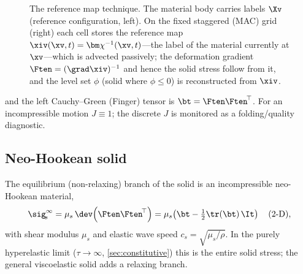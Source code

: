 \begin{figure}[t]\centering
{}
\caption{The reference map technique. The material body carries labels $\Xv$ (reference
configuration, left). On the fixed staggered (MAC) grid (right) each cell stores the
reference map $\xiv(\xv,t)=\bm\chi^{-1}(\xv,t)$---the label of the material currently at
$\xv$---which is advected passively; the deformation gradient $\Ften=(\grad\xiv)^{-1}$ and
hence the solid stress follow from it, and the level set $\phi$ (solid where $\phi\le0$) is
reconstructed from $\xiv$.}
\label{fig:rmt-schematic}
\end{figure}
and the left Cauchy--Green (Finger) tensor is $\bt=\Ften\Ften^{\!\top}$. For an
incompressible motion $J\equiv1$; the discrete $J$ is monitored as a folding/quality
diagnostic.

\subsection{Neo-Hookean solid}
The equilibrium (non-relaxing) branch of the solid is an incompressible neo-Hookean
material,
\begin{equation}
\sig_{\!s}^{\infty} = \mu_s\,\dev\!\left(\Ften\Ften^{\!\top}\right)
   = \mu_s\!\left(\bt - \tfrac12\tr(\bt)\,\It\right)\quad(\text{2-D}),
\label{eq:neohookean}
\end{equation}
with shear modulus $\mu_s$ and elastic wave speed $c_s=\sqrt{\mu_s/\rho}$. In the purely
hyperelastic limit ($\tau\to\infty$, \cref{sec:constitutive}) this is the entire solid
stress; the general viscoelastic solid adds a relaxing branch.

